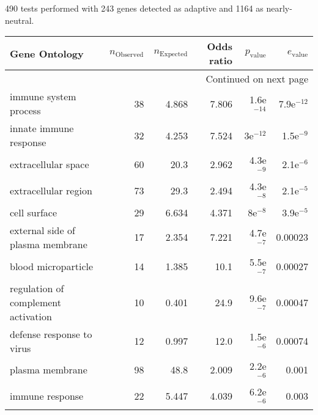 490 tests performed with 243 genes detected as adaptive and 1164 as nearly-neutral.
\scriptsize
\begin{longtable}{lrrrrr}
\toprule
                                Gene Ontology & $n_{\mathrm{Observed}}$ & $n_{\mathrm{Expected}}$ & Odds ratio & $p_{\mathrm{value}}$ & $e_{\mathrm{value}}$ \\
\midrule
\endhead
\midrule
\multicolumn{6}{r}{{Continued on next page}} \\
\midrule
\endfoot

\bottomrule
\endlastfoot
                        immune system process &                      38 &                   4.868 &      7.806 &         1.6e$^{-14}$ &         7.9e$^{-12}$ \\
                       innate immune response &                      32 &                   4.253 &      7.524 &           3e$^{-12}$ &          1.5e$^{-9}$ \\
                          extracellular space &                      60 &                    20.3 &      2.962 &          4.3e$^{-9}$ &          2.1e$^{-6}$ \\
                         extracellular region &                      73 &                    29.3 &      2.494 &          4.3e$^{-8}$ &          2.1e$^{-5}$ \\
                                 cell surface &                      29 &                   6.634 &      4.371 &            8e$^{-8}$ &          3.9e$^{-5}$ \\
             external side of plasma membrane &                      17 &                   2.354 &      7.221 &          4.7e$^{-7}$ &              0.00023 \\
                          blood microparticle &                      14 &                   1.385 &       10.1 &          5.5e$^{-7}$ &              0.00027 \\
          regulation of complement activation &                      10 &                   0.401 &       24.9 &          9.6e$^{-7}$ &              0.00047 \\
                    defense response to virus &                      12 &                   0.997 &       12.0 &          1.5e$^{-6}$ &              0.00074 \\
                              plasma membrane &                      98 &                    48.8 &      2.009 &          2.2e$^{-6}$ &                0.001 \\
                              immune response &                      22 &                   5.447 &      4.039 &          6.2e$^{-6}$ &                0.003 \\

\end{longtable}
